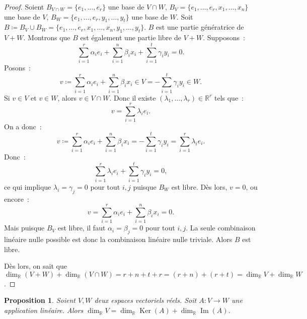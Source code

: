 \documentclass{article}
\DeclareMathOperator{\Ker}{Ker}
\DeclareMathOperator{\Imf}{Im}
\newcommand{\R}{\mathbb R}
\newtheorem{prp}[thm]{Proposition}
\theoremstyle{definition}
\theoremstyle{remark}
\begin{document}
		\begin{proof} Soient $B_{V \cap W} = \{e_1, \dotsc, e_r\}$  une base de $V \cap W$, $B_V = \{e_1, \dotsc, e_r, x_1, \dotsc, x_n\}$ une base de $V$,
		$B_W = \{e_1, \dotsc, e_r, y_1, \dotsc, y_t\}$ une base de $W$. Soit $B \coloneqq B_V \cup B_W = \{e_1, \dotsc, e_r, x_1, \dotsc, x_n, y_1, \dotsc, y_t\}$.
		$B$ est une partie génératrice de $V+W$. Montrons que $B$ est également une partie libre de $V+W$. Supposons~:
		\[\sum_{i=1}^r\alpha_ie_i + \sum_{i=1}^n\beta_ix_i + \sum_{i=1}^t\gamma_iy_i = 0.\] Posons~:
		\[v \coloneqq \sum_{i=1}^r\alpha_ie_i + \sum_{i=1}^n\beta_ix_i \in V = - \sum_{i=1}^t\gamma_iy_i \in W.\]
		Si $v \in V$ et $v \in W$, alors $v \in V \cap W$. Donc il existe $(\lambda_1, \dotsc, \lambda_r) \in \R^r$ tels que~:
		\[v = \sum_{i=1}^r\lambda_ie_i.\]
		On a donc~:
		\[v \coloneqq \sum_{i=1}^r\alpha_ie_i + \sum_{i=1}^n\beta_ix_i = -\sum_{i=1}^t\gamma_iy_i = \sum_{i=1}^r\lambda_ie_i.\]
		Donc~: \[\sum_{i=1}^r\lambda_ie_i + \sum_{i=1}^t\gamma_iy_i = 0,\] ce qui implique $\lambda_i = \gamma_j = 0$ pour tout $i, j$ puisque $B_W$ est libre. Dès lors,
		$v = 0$, ou encore~: \[v = \sum_{i=1}^r\alpha_ie_i + \sum_{i=1}^n\beta_ix_i = 0.\] Mais puisque $B_V$ est libre, il faut $\alpha_i = \beta_j = 0$ pour tout
		$i, j$. La seule combinaison linéaire nulle possible est donc la combinaison linéaire nulle triviale. Alors $B$ est libre.

		Dès lors, on sait que $\dim_\R(V+W) + \dim_\R(V \cap W) = r+n+t + r = (r+n) + (r+t) = \dim_\R V + \dim_\R W$. \end{proof}

		\begin{prp}\label{dim=dim+dim} Soient $V, W$ deux espaces vectoriels réels. Soit $A : V \to W$ une application linéaire.
		Alors $\dim_\R V = \dim_\R \Ker(A) + \dim_\R\Imf(A)$. \end{prp}
\end{document}
